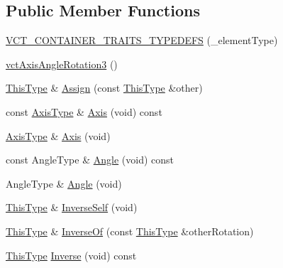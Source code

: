 \subsection*{Public Member Functions}
\begin{DoxyCompactItemize}
\item 
\hyperlink{classvct_axis_angle_rotation3_a6961961f60bc9f9ad6c2c1978f53238b}{V\-C\-T\-\_\-\-C\-O\-N\-T\-A\-I\-N\-E\-R\-\_\-\-T\-R\-A\-I\-T\-S\-\_\-\-T\-Y\-P\-E\-D\-E\-F\-S} (\-\_\-element\-Type)
\item 
\hyperlink{classvct_axis_angle_rotation3_a204b668773ce3653801fe19a776a95d5}{vct\-Axis\-Angle\-Rotation3} ()
\item 
\hyperlink{classvct_axis_angle_rotation3_af654a8037b7b82a378f69cb1bfd9b8dd}{This\-Type} \& \hyperlink{classvct_axis_angle_rotation3_adc6555da59fc027daac377767fbbb6c6}{Assign} (const \hyperlink{classvct_axis_angle_rotation3_af654a8037b7b82a378f69cb1bfd9b8dd}{This\-Type} \&other)
\item 
const \hyperlink{classvct_axis_angle_rotation3_a3178fd901bb60bb447711b9d5f7e7aae}{Axis\-Type} \& \hyperlink{classvct_axis_angle_rotation3_aa20fe6d1c17276a020efcc739dba37a0}{Axis} (void) const 
\item 
\hyperlink{classvct_axis_angle_rotation3_a3178fd901bb60bb447711b9d5f7e7aae}{Axis\-Type} \& \hyperlink{classvct_axis_angle_rotation3_a79e1af8f556aac9e63a26687a50b6745}{Axis} (void)
\item 
const Angle\-Type \& \hyperlink{classvct_axis_angle_rotation3_a49fa5666cf32e7883f8478c5ce135a75}{Angle} (void) const 
\item 
Angle\-Type \& \hyperlink{classvct_axis_angle_rotation3_a583ad12369e06b7788fd473a812663f1}{Angle} (void)
\item 
\hyperlink{classvct_axis_angle_rotation3_af654a8037b7b82a378f69cb1bfd9b8dd}{This\-Type} \& \hyperlink{classvct_axis_angle_rotation3_a088952ce769f71e7f13a38e2654714b3}{Inverse\-Self} (void)
\item 
\hyperlink{classvct_axis_angle_rotation3_af654a8037b7b82a378f69cb1bfd9b8dd}{This\-Type} \& \hyperlink{classvct_axis_angle_rotation3_a8172f2362d94c1c0a802568b99ae4fda}{Inverse\-Of} (const \hyperlink{classvct_axis_angle_rotation3_af654a8037b7b82a378f69cb1bfd9b8dd}{This\-Type} \&other\-Rotation)
\item 
\hyperlink{classvct_axis_angle_rotation3_af654a8037b7b82a378f69cb1bfd9b8dd}{This\-Type} \hyperlink{classvct_axis_angle_rotation3_a9f9e7f38289d1b9e77f3f3cc3c1d5213}{Inverse} (void) const 
\item 

\end{DoxyCompactItemize}
